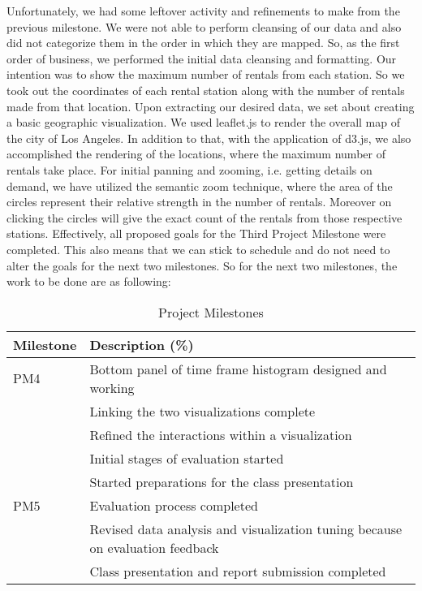 Unfortunately, we had some leftover activity and refinements to make from the previous milestone. We were not able to perform cleansing of our data and also did not categorize them in the order in which they are mapped. So, as the first order of business, we performed the initial data cleansing and formatting. Our intention was to show the maximum number of rentals from each station. So we took out the coordinates of each rental station along with the number of rentals made from that location.
Upon extracting our desired data, we set about creating a basic geographic visualization. We used leaflet.js to render the overall map of the city of Los Angeles.
In addition to that, with the application of d3.js, we also accomplished the rendering of the locations, where the maximum number of rentals take place. For initial panning and zooming, i.e. getting details on demand, we have utilized the semantic zoom technique, where the area of the circles represent their relative strength in the number of rentals. Moreover on clicking the circles will give the exact count of the rentals from those respective stations. Effectively, all proposed goals for the Third Project Milestone were completed. This also means that we can stick to schedule and do not need to alter the goals for the next two milestones.
So for the next two milestones, the work to be done are as following:
\\\newline
\begin{table}[h]
 \caption{Project Milestones}\vspace{1ex} %
 \label{tab:milestones}
 \scriptsize
 \centering %
   \begin{tabular}{p{2cm}|p{6cm}}
     Milestone & Description (\%)\\
   \hline
     PM4 & Bottom panel of time frame histogram designed and working\\
         & Linking the two visualizations complete\\
	     & Refined the interactions within a visualization\\
	     & Initial stages of evaluation started\\
	     & Started preparations for the class presentation\\
     PM5 & Evaluation process completed\\
         & Revised data analysis and visualization tuning because on evaluation feedback\\
         & Class presentation and report submission completed\\
   \end{tabular}
\end{table}
